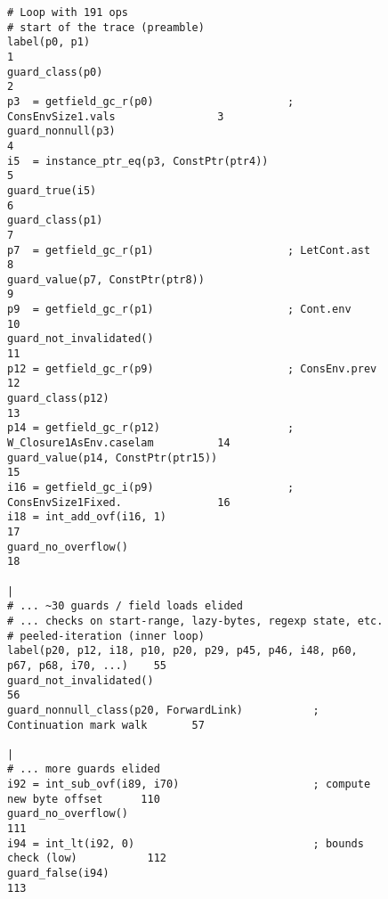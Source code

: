 \begin{figure}[!htbp]
	\centering

	\begin{minipage}{\textwidth}
\begin{lstlisting}[style=rptrace-style]
# Loop with 191 ops
# start of the trace (preamble)
label(p0, p1)                                                                  1
guard_class(p0)                                                                2
p3  = getfield_gc_r(p0)                     ; ConsEnvSize1.vals                3
guard_nonnull(p3)                                                              4
i5  = instance_ptr_eq(p3, ConstPtr(ptr4))                                      5
guard_true(i5)                                                                 6
guard_class(p1)                                                                7
p7  = getfield_gc_r(p1)                     ; LetCont.ast                      8
guard_value(p7, ConstPtr(ptr8))                                                9
p9  = getfield_gc_r(p1)                     ; Cont.env                         10
guard_not_invalidated()                                                        11
p12 = getfield_gc_r(p9)                     ; ConsEnv.prev                     12
guard_class(p12)                                                               13
p14 = getfield_gc_r(p12)                    ; W_Closure1AsEnv.caselam          14
guard_value(p14, ConstPtr(ptr15))                                              15
i16 = getfield_gc_i(p9)                     ; ConsEnvSize1Fixed.               16
i18 = int_add_ovf(i16, 1)                                                      17
guard_no_overflow()                                                            18
                                                                               |
# ... ~30 guards / field loads elided
# ... checks on start-range, lazy-bytes, regexp state, etc.
# peeled-iteration (inner loop)
label(p20, p12, i18, p10, p20, p29, p45, p46, i48, p60, p67, p68, i70, ...)    55
guard_not_invalidated()                                                        56
guard_nonnull_class(p20, ForwardLink)           ; Continuation mark walk       57
                                                                               |
# ... more guards elided
i92 = int_sub_ovf(i89, i70)                     ; compute new byte offset      110
guard_no_overflow()                                                            111
i94 = int_lt(i92, 0)                            ; bounds check (low)           112
guard_false(i94)                                                               113

\end{lstlisting}
\end{minipage}
\end{figure}
